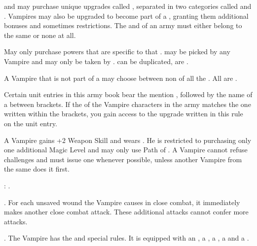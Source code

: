 \armynewsection{\bloodlines}

\vampirelords{} and \vampireheroes{} may purchase unique upgrades called \bloodpowers{}, separated in two categories called \bloodlinepowers{} and \ancientbloodpowers{}. Vampires may also be upgraded to become part of a \bloodline{}, granting them additional bonuses and sometimes restrictions. The \vampirelords{} and \vampireheroes{} of an army must either belong to the same \bloodline{} or none at all.


May only purchase powers that are specific to that \bloodline{}. \bloodlinepowers{} may be picked by any
Vampire and \ancientbloodpowers{} may only be taken by \vampirelords{}. \bloodlinepowers{} can be duplicated, \ancientbloodpowers{} are \oneofakind{}.


A Vampire that is not part of a \bloodline{} may choose between non \ancientbloodpowers{} of all the \bloodlines{}. All \bloodlinepowers{} are \oneofakind{}.


Certain unit entries in this army book bear the mention \bloodties{}, followed by the name of a \bloodline{} between brackets. If the \bloodline{} of the Vampire characters in the army matches the one written within the brackets, you gain access to the upgrade written in this rule on the unit entry.

\separator


A \brotherhood{} Vampire gains +2 Weapon Skill and wears \platearmour{}. He is restricted to purchasing
only one additional Magic Level and may only use Path of \necromancy{}. A \brotherhood{} Vampire cannot
refuse challenges and must issue one whenever possible, unless another Vampire from the same \bloodline{} does it first.

\bloodties{}: \vampireknights{}.

\startpricelist

 \textbf{\ancientbloodpower}. For each unsaved wound the Vampire causes in close combat, it immediately makes another close combat attack. These additional attacks cannot confer more attacks.

 \textbf{\bloodlinepower}. The Vampire has the \weaponmaster{} and  special rules. It is equipped with an \ahw , a \halberd , a \gw , a \lance{} and a \shield{}.

